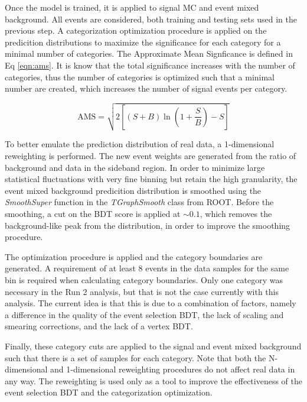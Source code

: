 \documentclass[12pt]{article}
\begin{document}
Once the model is trained, it is applied to signal MC and event mixed background. All events are considered, both training and testing sets used in the previous step. A categorization optimization procedure is applied on the predicition distributions to maximize the significance for each category for a minimal number of categories. The Approximate Mean Signficance is defined in Eq \ref{eqn:ams}. It is know that the total significance increases with the number of categories, thus the number of categories is optimized such that a minimal number are created, which increases the number of signal events per category.\par

\begin{equation} \label{eqn:ams}
\text{AMS} = \sqrt{2 \left[ (S + B) \ln \left(1 + \frac{S}{B}\right) - S \right]}
\end{equation}

To better emulate the prediction distribution of real data, a 1-dimensional reweighting is performed. The new event weights are generated from the ratio of background and data in the sideband region. In order to minimize large statistical fluctuations with very fine binning but retain the high granularity, the event mixed background predicition distribution is smoothed using the \textit{SmoothSuper} function in the \textit{TGraphSmooth} class from ROOT. Before the smoothing, a cut on the BDT score is applied at $\sim 0.1$, which removes the background-like peak from the distribution, in order to improve the smoothing procedure.\par

The optimization procedure is applied and the category boundaries are generated. A requirement of at least 8 events in the data samples for the same bin is required when calculating category boundaries. Only one category was necessary in the Run 2 analysis, but that is not the case currently with this analysis. The current idea is that this is due to a combination of factors, namely a difference in the quality of the event selection BDT, the lack of scaling and smearing corrections, and the lack of a vertex BDT.\par

Finally, these category cuts are applied to the signal and event mixed background such that there is a set of samples for each category. Note that both the N-dimensional and 1-dimensional reweighting procedures do not affect real data in any way. The reweighting is used only as a tool to improve the effectiveness of the event selection BDT and the categorization optimization.\par
\end{document}
